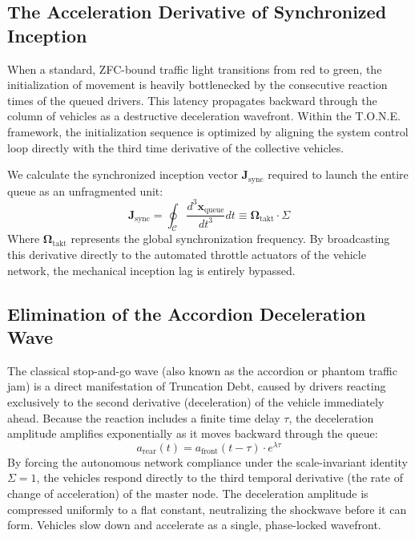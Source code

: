 \documentclass[11pt,a4paper]{article}
\begin{document}
\subsection{The Acceleration Derivative of Synchronized Inception}
When a standard, ZFC-bound traffic light transitions from red to green, the initialization of movement is heavily bottlenecked by the consecutive reaction times of the queued drivers. This latency propagates backward through the column of vehicles as a destructive deceleration wavefront. Within the T.O.N.E. framework, the initialization sequence is optimized by aligning the system control loop directly with the third time derivative of the collective vehicles.

We calculate the synchronized inception vector $\mathbf{J}_{\text{sync}}$ required to launch the entire queue as an unfragmented unit:
\begin{equation}
    \mathbf{J}_{\text{sync}} = \oint_{\mathcal{C}} \frac{d^3 \mathbf{x}_{\text{queue}}}{dt^3} dt \equiv \mathbf{\Omega}_{\text{takt}} \cdot \Sigma
\end{equation}
Where $\mathbf{\Omega}_{\text{takt}}$ represents the global synchronization frequency. By broadcasting this derivative directly to the automated throttle actuators of the vehicle network, the mechanical inception lag is entirely bypassed.

\subsection{Elimination of the Accordion Deceleration Wave}
The classical stop-and-go wave (also known as the accordion or phantom traffic jam) is a direct manifestation of Truncation Debt, caused by drivers reacting exclusively to the second derivative (deceleration) of the vehicle immediately ahead. Because the reaction includes a finite time delay $\tau$, the deceleration amplitude amplifies exponentially as it moves backward through the queue:
\begin{equation}
    a_{\text{rear}}(t) = a_{\text{front}}(t-\tau) \cdot e^{\lambda \tau}
\end{equation}
By forcing the autonomous network compliance under the scale-invariant identity $\Sigma = 1$, the vehicles respond directly to the third temporal derivative (the rate of change of acceleration) of the master node. The deceleration amplitude is compressed uniformly to a flat constant, neutralizing the shockwave before it can form. Vehicles slow down and accelerate as a single, phase-locked wavefront.
\end{document}
